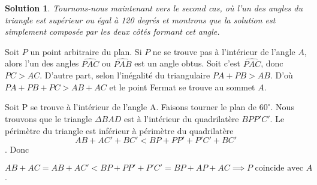 \documentclass[10pt,a4paper]{article}%
\theoremstyle{theorem}
\theoremstyle{definition}
\newtheorem*{solution*}{Solution}
\begin{document}
\begin{solution*}
	        
	        \textit{Tournons-nous maintenant vers le second cas, où l'un des angles du triangle est supérieur ou égal à 120 degrés et montrons que la solution est simplement composée par les deux côtés formant cet angle.}
	        
	        Soit $P$ un point arbitraire du plan. Si $P$ ne se trouve pas à l'intérieur de l'angle $A$, alors l'un des angles $\widehat{PAC}$ ou $\widehat{PAB}$ est un angle obtus. Soit c'est $\widehat{PAC}$, donc $PC>AC$. D'autre part, selon l'inégalité du triangulaire $PA+PB>AB$. D'où $PA+PB+PC>AB+AC$ et le point Fermat se trouve au sommet $A$.
	        
	        \begin{center}
	        \end{center}
	        Soit P se trouve à l'intérieur de l'angle A. Faisons tourner le plan de $60^\circ$. Nous trouvons que le triangle $\Delta BAD$ est à l'intérieur du quadrilatère $BPP'C'$. Le périmètre du triangle est inférieur à périmètre du quadrilatère 
	        \[AB+AC'+BC'<BP+PP'+P'C'+BC'\].
	        Donc 
	        
	        \[AB+AC=AB+AC'<BP+PP'+P'C'=BP+AP+AC \implies P \text{ coincide avec } A\].
	        
	        \begin{center}
	        \end{center}   
        
        \end{solution*} 
	        
\end{document}
